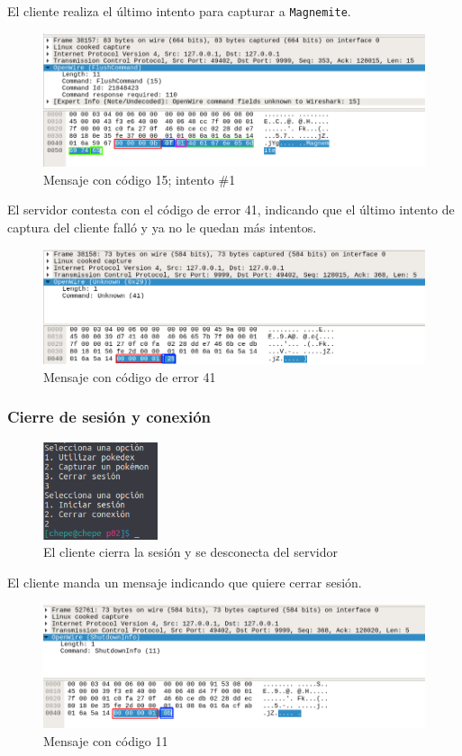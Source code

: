 \documentclass[12pt]{article}
\begin{document}
El cliente realiza el último intento para capturar a \texttt{Magnemite}.
\begin{figure}[H]
  \centering
  \includegraphics[width=\textwidth]{28}
  \caption{Mensaje con código 15; intento $\#$1}
\end{figure}

El servidor contesta con el código de error 41, indicando que el último intento de captura del cliente falló y ya no le quedan más intentos.
\begin{figure}[H]
  \centering
  \includegraphics[width=\textwidth]{29}
  \caption{Mensaje con código de error 41}
\end{figure}

\subsubsection{Cierre de sesión y conexión}

\begin{figure}[H]
  \centering
  \includegraphics[width=0.3\textwidth]{30}
  \caption{El cliente cierra la sesión y se desconecta del servidor}
\end{figure}

El cliente manda un mensaje indicando que quiere cerrar sesión.
\begin{figure}[H]
  \centering
  \includegraphics[width=\textwidth]{31}
  \caption{Mensaje con código 11}
\end{figure}
\end{document}

